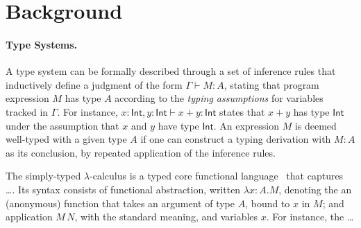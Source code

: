\documentclass{llncs}
\newcommand{\mypara}[1]{\paragraph{\textbf{#1}.}}
\begin{document}

\section{Background}

\mypara{Type Systems} A type system can be formally described through
a set of inference rules that inductively define a judgment of the
form $\Gamma \vdash M : A$, stating that program expression $M$ has
type $A$ according to the \emph{typing assumptions} for variables
tracked in $\Gamma$. For instance,
$x{:}\mathsf{Int}, y{:}\mathsf{Int} \vdash x+y : \mathsf{Int}$ states
that $x+y$ has type $\mathsf{Int}$ under the assumption that $x$ and
$y$ have type $\mathsf{Int}$.  An expression $M$ is deemed well-typed
with a given type $A$ if one can construct a typing derivation with $M :
A$ as its conclusion, by repeated application of the inference rules.

The simply-typed $\lambda$-calculus is a typed core functional
language~\cite{} that captures \dots. Its syntax consists of
functional abstraction, written $\lambda x{:}A.M$, denoting the
an (anonymous) function that takes an argument of type $A$, bound to
$x$ in $M$; and application $M\,N$, with the standard meaning, and
variables $x$. For instance, the \dots {}
\end{document}
